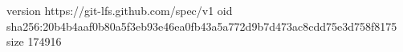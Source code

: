 version https://git-lfs.github.com/spec/v1
oid sha256:20b4b4aaf0b80a5f3eb93e46ea0fb43a5a772d9b7d473ac8cdd75e3d758f8175
size 174916
